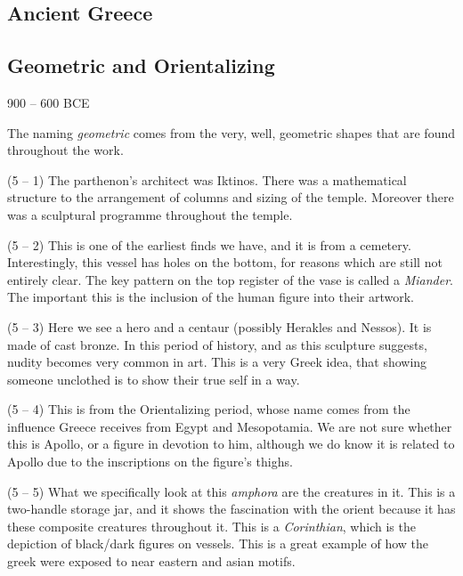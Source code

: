 \documentclass{article}
\begin{document}
    \begin{spacing}{1.2}
    \newpage
    \section{Ancient Greece}
    \subsection{Geometric and Orientalizing}
    \begin{flushright}
        900 -- 600 BCE
    \end{flushright}
    The naming \emph{geometric} comes from the very, well, geometric shapes that are found throughout the work.

    (5 -- 1) The parthenon's architect was Iktinos. There was a mathematical structure to the arrangement of columns and sizing of the temple. Moreover there was a sculptural programme throughout the temple. 

    (5 -- 2) This is one of the earliest finds we have, and it is from a cemetery. Interestingly, this vessel has holes on the bottom, for reasons which are still not entirely clear. The key pattern on the top register of the vase is called a \emph{Miander}. The important this is the inclusion of the human figure into their artwork.

    (5 -- 3) Here we see a hero and a centaur (possibly Herakles and Nessos). It is made of cast bronze. In this period of history, and as this sculpture suggests, nudity becomes very common in art. This is a very Greek idea, that showing someone unclothed is to show their true self in a way.

    (5 -- 4) This is from the Orientalizing period, whose name comes from the influence Greece receives from Egypt and Mesopotamia. We are not sure whether this is Apollo, or a figure in devotion to him, although we do know it is related to Apollo due to the inscriptions on the figure's thighs.

    (5 -- 5) What we specifically look at this \emph{amphora} are the creatures in it. This is a two-handle storage jar, and it shows the fascination with the orient because it has these composite creatures throughout it. This is a \emph{Corinthian}, which is the depiction of black/dark figures on vessels. This is a great example of how the greek were exposed to near eastern and asian motifs. 


\end{spacing}
\end{document}
